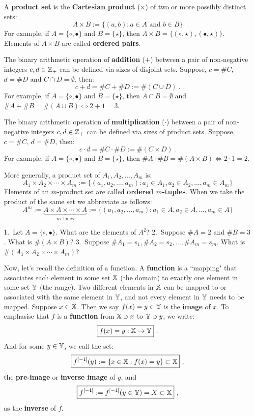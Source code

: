 A {\bf product set} is the {\bf Cartesian product} ($\times$) of two or more possibly distinct sets:
\[
\boxed{
A \times B := \{(a,b): a \in A \text{ and } b \in B \}
}
\]
For example, if $A=\{\circ,\bullet\}$ and $B=\{\star\}$, then $A\times B = \{(\circ,\star), (\bullet,\star)\}$.  Elements of $A \times B$ are called {\bf ordered pairs}.  

The binary arithmetic operation of {\bf addition} ($+$) between a pair of non-negative integers $c,d \in \mathbb{Z}_+$ can be defined via sizes of disjoint sets.  Suppose, $c=\#C$, $d=\#D$ and $C \cap D = \emptyset$, then:
\[
c+d = \#C + \#D := \# (C \cup D) \ .
\]
For example,  if $A=\{\circ,\bullet\}$ and $B=\{\star\}$, then $A \cap B=\emptyset$ and $\#A + \#B = \#(A \cup B) \iff 2+1=3$.

The binary arithmetic operation of {\bf multiplication} ($\cdot$) between a pair of non-negative integers $c,d \in \mathbb{Z}_+$ can be defined via sizes of product sets.  Suppose, $c=\#C$, $d=\#D$, then:
\[
c \cdot d = \#C \cdot \#D := \# (C \times D) \ .
\]
For example,  if $A=\{\circ,\bullet\}$ and $B=\{\star\}$, then $\#A \cdot \#B = \#(A \times B) \iff 2 \cdot 1=2$.

More generally, a product set of $A_1,A_2,\ldots,A_m$ is:
\[
\boxed{
A_1 \times A_2 \times \cdots \times A_m := \{(a_1,a_2,\ldots,a_{m}): a_1 \in A_1, a_2 \in A_2, \ldots, a_{m} \in A_m \}
}
\]
Elements of an $m$-product set are called {\bf ordered $m$-tuples}.  When we take the product of the same set we abbreviate as follows:
\[
\boxed{
A^m := \underset{m \text{ times}}{\underbrace{A \times A \times \cdots \times A}} := \{(a_1,a_2,\ldots,a_m): a_1 \in A, a_2 \in A, \ldots, a_{m} \in A \}
}
\]
\begin{classwork}
1.~Let $A=\{\circ, \bullet \}$.  What are the elements of $A^2$?  2.~Suppose $\# A = 2$ and $\# B = 3$.  What is $\# (A \times B)$?  3.~Suppose $\# A_1 = s_1, \# A_2 = s_2, \ldots, \# A_m = s_m$.  What is $\# (A_1 \times A_2 \times \cdots \times A_m)$?
\vspace{4cm}
\end{classwork}

Now, let's recall the definition of a function.  A {\bf function} is a ``mapping" that associates each element in some set $\mathbb{X}$ (the domain) to exactly one element in some set $\mathbb{Y}$ (the range). Two different elements in $\mathbb{X}$ can be mapped to or associated with the same element in $\mathbb{Y}$, and not every element in $\mathbb{Y}$ needs to be mapped.  Suppose $x \in \mathbb{X}$. Then we say ${f(x)=y \in \mathbb{Y}}$ is the {\bf image} of $x$.  To emphasise that $f$ is a {\bf function} from $\mathbb{X} \ni x$ to $\mathbb{Y} \ni y$, we write:
$$\boxed{f(x)=y:\mathbb{X} \to \mathbb{Y}} \ .$$
And for some $y \in \mathbb{Y}$, we call the set:
$$\boxed{f^{[-1]}(y) := \{x \in \mathbb{X} : f(x)=y \} \subset \mathbb{X}} \ ,$$
the {\bf pre-image} or {\bf inverse image} of $y$, and 
$$\boxed{f^{[-1]} := f^{[-1]}(y \in \mathbb{Y}) = X \subset \mathbb{X}} \ ,$$
as the {\bf inverse} of $f$.

